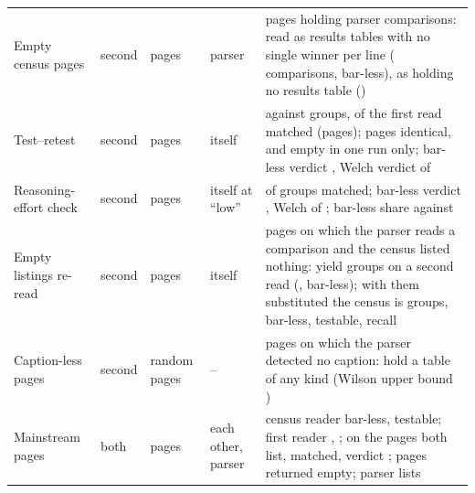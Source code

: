 \documentclass[sigconf,anonymous]{aamas}
\begin{document}
\begin{table}[t]
\begin{tabular}{@{}p{2.7cm}lp{1.9cm}p{1.8cm}p{10.4cm}@{}}
Empty census pages & second & \nEcPages{} pages & parser & pages holding \nEcComparisons{} parser comparisons: \nEcNonePages{} read as results tables with no single winner per line (\nEcNoneComparisons{} comparisons, \nEcNoneNeither{} bar-less), \nEcNotablePages{} as holding no results table (\nEcNotableComparisons{}) \\
Test--retest & second & \nRtPages{} pages & itself & \nRtGroupsFirst{} against \nRtGroupsSecond{} groups, \nRtMatchedCi{} of the first read matched (pages); \nRtPagesIdentical{} pages identical, \nRtPagesFirstEmpty{} and \nRtPagesSecondEmpty{} empty in one run only; bar-less verdict \nRtNeitherAgreePct{}, Welch verdict \nRtFailAgree{} of \nRtBothTested{} \\
Reasoning-effort check & second & \nRePages{} pages & itself at ``low'' & \nReMatchedCi{} of groups matched; bar-less verdict \nReNeitherAgreePct{}, Welch \nReFailAgree{} of \nReBothTested{}; bar-less share \nReNeitherFirst{} against \nReNeitherSecond{} \\
Empty listings re-read & second & \nZrPages{} pages & itself & pages on which the parser reads a comparison and the census listed nothing: \nZrPagesWithGroups{} yield groups on a second read (\nZrGroups{}, \nZrNeither{} bar-less); with them substituted the census is \nZruGroups{} groups, \nZruNeitherCi{} bar-less, \nZruTestableCi{} testable, recall \nZruRecall{} \\
Caption-less pages & second & \nNcPages{} random pages & -- & pages on which the parser detected no caption: \nNcPagesAnyTable{} hold a table of any kind (Wilson upper bound \nNcPagesAnyTableUpper{}) \\
Mainstream pages & both & \nMsPages{} pages & each other, parser & census reader \nMsNeitherCi{} bar-less, \nMsTestableCi{} testable; first reader \nScReaderNeither{}, \nScReaderTestable{}; on the \nMsCrossSharedPages{} pages both list, \nMsCrossSharedMatchedPct{} matched, verdict \nMsCrossSharedNeitherAgreePct{}; \nMsCrossPagesSecondEmpty{} pages returned empty; parser lists \nMsRecall{} \\
\bottomrule
\end{tabular}
\end{table}
\end{document}
